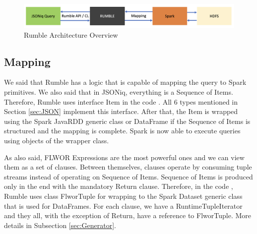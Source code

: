 \begin{figure}[h!]
	\includegraphics[width=\linewidth]{rumble_architecture.png}
	\caption{Rumble Architecture Overview}
	\label{fig:Rumble_Architecture}
\end{figure}

\subsection{Mapping}
\label{sec:RumbleMapping}
We said that Rumble has a logic that is capable of mapping the query to Spark primitives. We also said that in JSONiq, everything is a Sequence of Items. Therefore, Rumble uses interface Item in the code \cite{RumbleRepository}. All 6 types mentioned in Section \ref{sec:JSON} implement this interface. After that, the Item is wrapped using the Spark JavaRDD generic class or DataFrame if the Sequence of Items is structured and the mapping is complete. Spark is now able to execute queries using objects of the wrapper class.

As also said, FLWOR Expressions are the most powerful ones and we can view them as a set of clauses. Between themselves, clauses operate by consuming tuple streams instead of operating on Sequence of Items. Sequence of Items is produced only in the end with the mandatory Return clause. Therefore, in the code \cite{RumbleRepository}, Rumble uses class FlworTuple for wrapping to the Spark Dataset generic class that is used for DataFrames. For each clause, we have a RuntimeTupleIterator and they all, with the exception of Return, have a reference to FlworTuple. More details in Subsection \ref{sec:Generator}.

